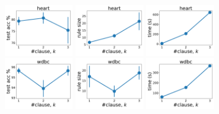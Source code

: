 \begin{figure}
	\centering
	
	\subfloat
	{\includegraphics[width=0.27\textwidth]{figures/interpretability/relaxed-cnf/heart_test_accuracy_vary_clause.pdf}}
	\subfloat
	{\includegraphics[width=0.27\textwidth]{figures/interpretability/relaxed-cnf/heart_rule_size_vary_clause.pdf}}
	\subfloat
	{\includegraphics[width=0.27\textwidth]{figures/interpretability/relaxed-cnf/heart_time_vary_clause.pdf}} 
	\\
	
	\subfloat
	{\includegraphics[width=0.27\textwidth]{figures/interpretability/relaxed-cnf/wdbc_test_accuracy_vary_clause.pdf}}
	\subfloat
	{\includegraphics[width=0.27\textwidth]{figures/interpretability/relaxed-cnf/wdbc_rule_size_vary_clause.pdf}}
	\subfloat
	{\includegraphics[width=0.27\textwidth]{figures/interpretability/relaxed-cnf/wdbc_time_vary_clause.pdf}} 
	\\
	

\end{figure}

